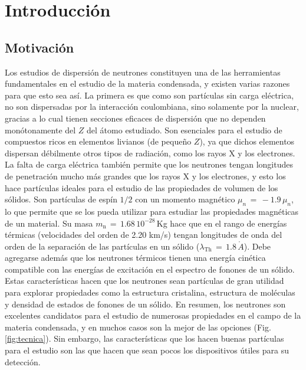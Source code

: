 \chapter{Introducci\'on}
\graphicspath{{./figs/01_intro/}}
\section{Motivación}\label{S:motivacion}
Los estudios de dispersión de neutrones constituyen una de las herramientas fundamentales en el estudio de la materia condensada\cite{squires}, y existen varias razones para que esto sea así. La primera es que como son partículas sin carga eléctrica, no son dispersadas por la interacción coulombiana, sino solamente por la nuclear, gracias a lo cual tienen secciones eficaces de dispersión que no dependen monótonamente del $Z$ del átomo estudiado\cite{secceff}. Son esenciales para el estudio de compuestos ricos en elementos livianos (de pequeño $Z$), ya que dichos elementos dispersan débilmente otros tipos de radiación, como los rayos X y los electrones. La falta de carga eléctrica también permite que los neutrones tengan longitudes de penetración mucho más grandes que los rayos X y los electrones, y esto los hace partículas ideales para el estudio de las propiedades de volumen de los sólidos\cite{squires}. Son partículas de espín $1/2$ con un momento magnético $\mu_n \, = \, -1.9\,\mu_n$, lo que permite que se los pueda utilizar para estudiar las propiedades magnéticas de un material\cite{squires}. Su masa $m_{\text{n}} \, = \, 1.68 \, 10^{-28}$\,Kg hace que en el rango de energías térmicas (velocidades del orden de 2.20 km/s) tengan longitudes de onda del orden de la separación de las partículas en un sólido ($\lambda_{\text{Th}} \, = \, 1.8\,\mathring{A}$)\cite{squires}. Debe agregarse además que los neutrones térmicos tienen una energía cinética compatible con las e\-ner\-gí\-as de excitación en el espectro de fonones de un sólido\cite{squires}. Estas características hacen que los neutrones sean partículas de gran utilidad para explorar propiedades como la estructura cristalina, estructura de moléculas y densidad de estados de fonones de un sólido. En resumen, los neutrones son excelentes candidatos para el estudio de numerosas propiedades en el campo de la materia condensada, y en muchos casos son la mejor de las opciones (Fig.\,\ref{fig:tecnica}). Sin embargo, las características que los hacen buenas partículas para el estudio son las que hacen que sean pocos los dispositivos útiles para su detección. 
